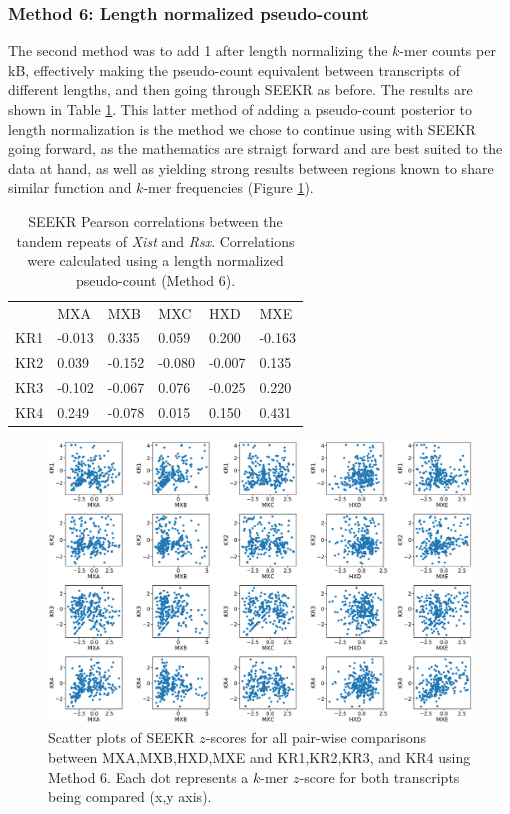 \subsubsection{Method 6: Length normalized pseudo-count}
The second method was to add 1 after length normalizing the $k$-mer counts per kB, effectively making the pseudo-count equivalent between transcripts of different lengths, and then going through SEEKR as before. The results are shown in Table \ref{tbl:kmers6}. This latter method of adding a pseudo-count posterior to length normalization is the method we chose to continue using with SEEKR going forward, as the mathematics are straigt forward and are best suited to the data at hand, as well as yielding strong results between regions known to share similar function and $k$-mer frequencies (Figure \ref{fig:9plots}). 

\begin{table}[ht]
\begin{center}
\begin{tabular}{llllll}
&MXA & MXB                   & MXC                  & HXD                  & MXE                                        \\
KR1 & -0.013 & 0.335  & 0.059  & 0.200  & -0.163 \\
KR2 & 0.039   & -0.152 & -0.080  & -0.007 & 0.135  \\
KR3 & -0.102   & -0.067 & 0.076  & -0.025 & 0.220   \\
KR4 & 0.249   & -0.078 & 0.015 & 0.150  & 0.431 
\end{tabular}
\caption[Length normalized pseudocount to $k$-mer frequencies]{SEEKR Pearson correlations between the tandem repeats of \emph{Xist} and \emph{Rsx}. Correlations were calculated using a length normalized pseudo-count (Method 6).}
\label{tbl:kmers6}
\end{center}
\end{table}

\begin{figure}[h]
\centering
\includegraphics[width=\textwidth]{images/9_figs.pdf}
\caption[Length normalized pseudocount $z$-score scatter plots]{Scatter plots of SEEKR $z$-scores for all pair-wise comparisons between MXA,MXB,HXD,MXE and KR1,KR2,KR3, and KR4 using Method 6. Each dot represents a $k$-mer $z$-score for both transcripts being compared (x,y axis).}
\label{fig:9plots}
\end{figure}

